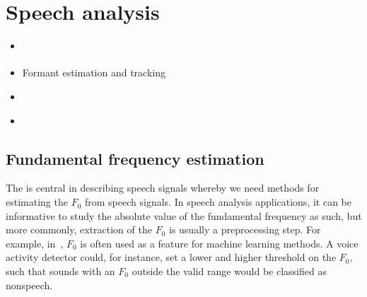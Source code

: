 \documentclass[letterpaper,10pt,english]{jupyterBook}
\begin{document}
\sphinxstepscope


\chapter{Speech analysis}
\label{\detokenize{Speech_analysis:speech-analysis}}\label{\detokenize{Speech_analysis::doc}}\begin{itemize}
\item {} 
\sphinxAtStartPar
{\hyperref[\detokenize{Analysis/Fundamental_frequency_estimation::doc}]{}}

\item {} 
\sphinxAtStartPar
Formant estimation and tracking

\item {} 
\sphinxAtStartPar
{\hyperref[\detokenize{Analysis/Measurements_for_medical_applications::doc}]{}}

\item {} 
\sphinxAtStartPar
{\hyperref[\detokenize{Analysis/Inverse_filtering_for_glottal_activity_estimation::doc}]{}}

\end{itemize}

\sphinxstepscope


\section{Fundamental frequency estimation}
\label{\detokenize{Analysis/Fundamental_frequency_estimation:fundamental-frequency-estimation}}\label{\detokenize{Analysis/Fundamental_frequency_estimation::doc}}
\sphinxAtStartPar
The  is central
in describing speech signals whereby we need methods for estimating the
\(F_0\) from speech signals. In speech analysis applications, it can be
informative to study the absolute value of the fundamental frequency as
such, but more commonly, extraction of the \(F_0\) is usually a
pre\sphinxhyphen{}processing step. For example, in , \(F_0\) is often used as a
feature for machine learning methods. A voice activity detector could,
for instance, set a lower and higher threshold on the \(F_0\), such that
sounds with an \(F_0\) outside the valid range would be classified as
non\sphinxhyphen{}speech.
\end{document}

